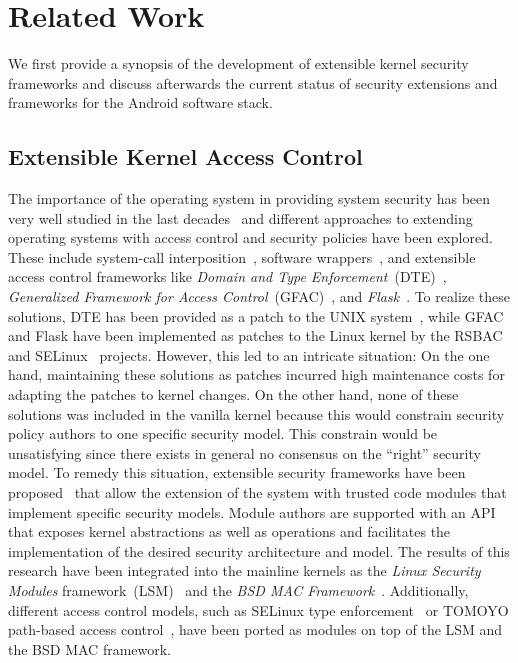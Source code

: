 \documentclass[letterpaper,twocolumn,10pt]{article}
\begin{document}
 
\section{Related Work}
\label{sec:relatedwork}
We first provide a synopsis of the development of extensible kernel security frameworks and discuss afterwards the current status of security extensions and frameworks for the Android software stack.

\subsection{Extensible Kernel Access Control}
\label{sec:related:extkernel}

The importance of the operating system in providing system security has been very well studied in the last decades~\cite{1451869,Linden:1976:OSS:356678.356682,Baker:1996:FBU:304851.304886,Loscocco98theinevitability} and different approaches to extending operating systems with access control and security policies have been explored. These include system-call interposition~\cite{Fraser:2001:LMY:647054.715751,Provos:2003:IHS:1251353.1251371}, software wrappers~\cite{interposition1}, and extensible access control frameworks like \textit{Domain and Type Enforcement}~(DTE)~\cite{Badger:1995:PDT:882491.884237}, \textit{Generalized Framework for Access Control}~(GFAC)~\cite{gfac}, and \textit{Flask}~\cite{Flask99}. To realize these solutions, DTE has been provided as a patch to the UNIX system~\cite{Badger:1995:DTE:1267591.1267603}, while GFAC and Flask have been implemented as patches to the Linux kernel by the RSBAC~\cite{ott01} and SELinux~\cite{SELinux01} projects. However, this led to an intricate situation: On the one hand, maintaining these solutions as patches incurred high maintenance costs for adapting the patches to kernel changes. On the other hand, none of these solutions was included in the vanilla kernel because this would constrain security policy authors to one specific security model. This constrain would be unsatisfying since there exists in general no consensus on the ``right'' security model. To remedy this situation, extensible security frameworks have been proposed~\cite{Wright:2002:LSM:647253.720287,conf/usenix/WatsonMVF03} that allow the extension of the system with trusted code modules that implement specific security models. Module authors are supported with an API that exposes kernel abstractions as well as operations and facilitates the implementation of the desired security architecture and model. The results of this research have been integrated into the mainline kernels as the \textit{Linux Security Modules} framework~(LSM)~\cite{Wright:2002:LSM:647253.720287} and the \textit{BSD MAC Framework}~\cite{conf/usenix/WatsonMVF03}. Additionally, different access control models, such as SELinux type enforcement~\cite{smalley:01} or TOMOYO path-based access control~\cite{tomoyo}, have been ported as modules on top of the LSM and the BSD MAC framework.
\end{document}
